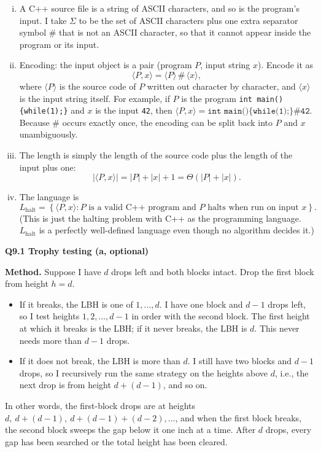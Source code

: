 \documentclass[11pt]{article}
\newcommand{\set}[1]{\left\{#1\right\}}
\newcommand{\abs}[1]{\left|#1\right|}
\newcommand{\inner}[1]{\langle #1 \rangle}
\newcommand{\qpage}[1]{\clearpage\noindent\textbf{\large #1}\par\medskip}
\begin{document}
\begin{enumerate}[(i)]
  \item A C++ source file is a string of ASCII characters, and so is the program's input.
  I take $\Sigma$ to be the set of ASCII characters plus one extra separator symbol $\#$ that is not an ASCII character, so that it cannot appear inside the program or its input.

  \item Encoding: the input object is a pair (program $P$, input string $x$).
  Encode it as
  \[
    \inner{P, x} = \inner{P}\,\#\,\inner{x},
  \]
  where $\inner{P}$ is the source code of $P$ written out character by character, and $\inner{x}$ is the input string itself.
  For example, if $P$ is the program
  \texttt{int main()\{while(1);\}} and $x$ is the input \texttt{42}, then
  $\inner{P,x} = \texttt{int main()\{while(1);\}\#42}$.
  Because $\#$ occurs exactly once, the encoding can be split back into $P$ and $x$ unambiguously.

  \item The length is simply the length of the source code plus the length of the input plus one:
  \[
    \abs{\inner{P,x}} = \abs{P} + \abs{x} + 1 = \Theta(\abs{P} + \abs{x}).
  \]

  \item The language is
  \[
    L_{\text{halt}} = \set{\inner{P,x} : P \text{ is a valid C++ program and } P \text{ halts when run on input } x}.
  \]
  (This is just the halting problem with C++ as the programming language. $L_{\text{halt}}$ is a perfectly well-defined language even though no algorithm decides it.)
\end{enumerate}

\qpage{Q9.1 Trophy testing (a, optional)}

\textbf{Method.}
Suppose I have $d$ drops left and both blocks intact.
Drop the first block from height $h = d$.
\begin{itemize}
  \item If it breaks, the LBH is one of $1, \ldots, d$.
  I have one block and $d-1$ drops left, so I test heights $1, 2, \ldots, d-1$ in order with the second block.
  The first height at which it breaks is the LBH; if it never breaks, the LBH is $d$.
  This never needs more than $d-1$ drops.
  \item If it does not break, the LBH is more than $d$.
  I still have two blocks and $d-1$ drops, so I recursively run the same strategy on the heights above $d$, i.e., the next drop is from height $d + (d-1)$, and so on.
\end{itemize}
In other words, the first-block drops are at heights $d,\ d+(d-1),\ d+(d-1)+(d-2), \ldots$, and when the first block breaks, the second block sweeps the gap below it one inch at a time.
After $d$ drops, every gap has been searched or the total height has been cleared.
\end{document}
